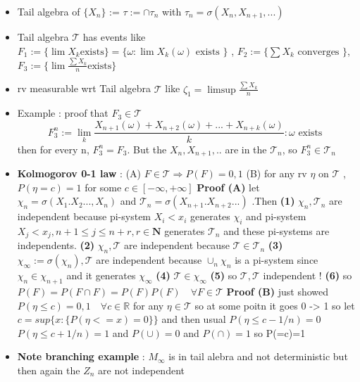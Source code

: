\documentclass[10pt,landscape,a4paper]{article}
\newcommand{\Tau}{\mathcal{T}}
\begin{document}
\begin{multicols*}{3}
\begin{spacing}{0.5}
\begin{itemize}
\item Tail algebra of $\{X_n\}$ := $\tau := \cap {\tau}_n$ with ${\tau}_n=\sigma(X_n,X_{n+1},...)$

\item Tail algebra $\Tau$ has events like $F_1 := \{ \lim X_k \text{exists} \} = \{ \omega : \lim X_k(\omega) \text{ exists }  \}$ , $F_2 := \{ \sum X_k \text{ converges } \} $, $F_3 := \{ \lim \frac{\sum X_k}{n} \text{exists} \} $

\item rv measurable wrt Tail algebra $\Tau$ like $\zeta_1 = \limsup \frac{\sum X_k}{n}$

\item  \colorbox{green!10}{Example : proof that $F_3 \in \Tau$} $$F_3^n := \lim_k \frac{X_{n+1} (\omega)+X_{n+2} (\omega) +...+ X_{n+k} (\omega)}{k} : \omega \text{ exists }$$ then for every n, $F_3^n=F_3$. But the $X_n,X_{n+1},..$ are in the $\Tau_n$, so $F_3^n \in \Tau_n$

\item \textbf{Kolmogorov 0-1 law} : (A) $F \in \Tau \Rightarrow P(F)=0,1$ (B) for any rv $\eta \text{ on } \Tau$ , $P (\eta=c)=1$ for some $c \in [-\infty,+\infty]$ \textbf{ Proof (A) } let $\chi_n=\sigma(X_1.X_2...,X_n)$ and $\Tau_n=\sigma(X_{n+1}.X_{n+2}...)$ .Then \textbf{(1)} $\chi_n , \Tau_n$ are independent because pi-system $X_i<x_i$ generates $\chi_i$ and pi-system $X_j<x_j , n+1 \le j \le n+r, r \in \mathbf{N}$ generates $\Tau_n$ and these pi-systems are independents. \textbf{(2)} $\chi_n , \Tau$ are independent because $\Tau \in \Tau_n$ \textbf{(3)} $\chi_{\infty}:= \sigma(\chi_n),\Tau$ are independent because $\cup_n \chi_n$ is a pi-system since $ \chi_n \in \chi_{n+1} $ and it generates $\chi_{\infty}$ \textbf{(4)} $\Tau \in \chi_{\infty}$ \textbf{(5)} so $\Tau,\Tau$ independent ! \textbf{(6)} so $P(F) = P(F \cap F) = P(F) P(F) \quad \forall F \in \Tau$ \textbf{Proof (B)} just showed $P(\eta \le c)=0,1 \quad \forall c \in \mathbb{R}$ for any $\eta \in \Tau$ so at some poitn it goes 0 -> 1 so let $c=sup \bigg \{ x : \big \{ P (\eta <= x)  = 0 \big \}  \bigg  \} $ and then usual $P(\eta \le c-1/n ) =0$ $P(\eta \le c+1/n ) =1$ and $P(\cup)=0$ and $P(\cap)=1$ so P(=c)=1

\item \textbf{Note branching example} : $M_{\infty}$ is in tail alebra and not deterministic but then again the $Z_n$ are not independent


\end{itemize}
\end{spacing}
\end{multicols*}
\end{document}
